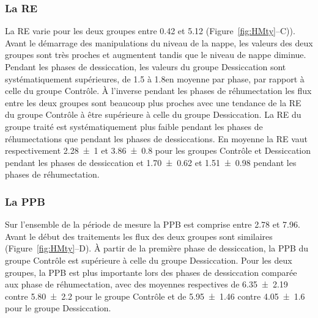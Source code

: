 \subsubsection{La RE}

La RE varie pour les deux groupes entre \num{0.42} et \SI{5.12}{\uml} (Figure~\ref{fig:HMty}--C)).
Avant le démarrage des manipulations du niveau de la nappe, les valeurs des deux groupes sont très proches et augmentent tandis que le niveau de nappe diminue.
Pendant les phases de dessiccation, les valeurs du groupe Dessiccation sont systématiquement supérieures, de \num{1.5} à \SI{1.8}{\uml}en moyenne par phase, par rapport à celle du groupe Contrôle.
À l'inverse pendant les phases de réhumectation les flux entre les deux groupes sont beaucoup plus proches avec une tendance de la RE du groupe Contrôle à être supérieure à celle du groupe Dessiccation.
La RE du groupe traité est systématiquement plus faible pendant les phases de réhumectations que pendant les phases de dessiccations.
En moyenne la RE vaut respectivement \num{2.28(100)} et \SI{3.86(080)}{\uml} pour les groupes Contrôle et Dessiccation pendant les phases de dessiccation et \num{1.70(062)} et \SI{1.51(098)}{\uml} pendant les phases de réhumectation.
\subsubsection{La PPB}

Sur l'ensemble de la période de mesure la PPB est comprise entre \num{2.78} et \SI{7.96}{\uml}.
Avant le début des traitements les flux des deux groupes sont similaires (Figure~\ref{fig:HMty}--D).
À partir de la première phase de dessiccation, la PPB du groupe Contrôle est supérieure à celle du groupe Dessiccation.
Pour les deux groupes, la PPB est plus importante lors des phases de dessiccation comparée aux phase de réhumectation, avec des moyennes respectives de \num{6.35(219)} contre \num{5.80(220)} pour le groupe Contrôle et de \num{5.95(146)} contre \SI{4.05(160)}{\uml} pour le groupe Dessiccation.

